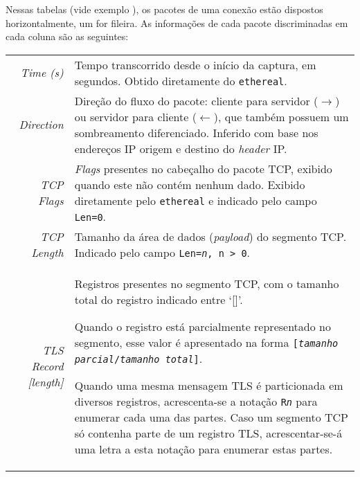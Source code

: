 Nessas tabelas (vide exemplo ), os pacotes de uma conexão 
estão dispostos horizontalmente, um for fileira.
As informações de cada pacote discriminadas em cada coluna são as seguintes:

\begin{tabular}{@{}rp{11cm}@{}}

\emph{Time (s)} & Tempo transcorrido desde o início da captura, em segundos. 
                  Obtido diretamente do \texttt{ethereal}. \\

\addlinespace

\emph{Direction} & Direção do fluxo do pacote: cliente para servidor ($\longrightarrow$)
ou servidor para cliente ($\longleftarrow$), que também possuem um sombreamento diferenciado. 
Inferido com base nos endereços IP origem e destino do \emph{header} IP. \\

\addlinespace

\emph{TCP Flags} & \emph{Flags} presentes no cabeçalho do pacote TCP, exibido quando este
não contém nenhum dado. 
Exibido diretamente pelo \texttt{ethereal} e indicado pelo campo \texttt{Len=0}. \\

\addlinespace

\emph{TCP Length} & Tamanho da área de dados (\emph{payload}) do segmento TCP.
	Indicado pelo campo \texttt{Len=\emph{n}, n > 0}. \\

\addlinespace

\emph{TLS Record [length]} & Registros presentes no segmento TCP, com o tamanho total do registro
	indicado entre `[]'.
	
	Quando o registro está parcialmente representado no segmento, esse valor é
	apresentado na forma \texttt{[\emph{tamanho parcial}/\emph{tamanho total}]}.
	
	Quando uma mesma mensagem TLS é particionada em diversos registros, acrescenta-se a notação
	\texttt{R\emph{n}} para enumerar cada uma das partes. Caso um segmento TCP só contenha
	parte de um registro TLS, acrescentar-se-á uma letra a esta notação para enumerar estas partes. \\
\end{tabular}
